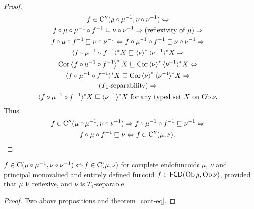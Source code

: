 \begin{proof}
\begin{multline*}
  f \in \continuous'' (\mu \circ \mu^{- 1} , \nu \circ \nu^{- 1})
  \Leftrightarrow \\ f \circ \mu \circ \mu^{- 1} \circ f^{- 1}
  \sqsubseteq \nu \circ \nu^{- 1} \Rightarrow \text{(reflexivity of
  $\mu$)} \Rightarrow \\ f \circ \mu \circ f^{- 1} \sqsubseteq \nu
  \circ \nu^{- 1} \Leftrightarrow f \circ \mu^{- 1} \circ f^{- 1}
  \sqsubseteq \nu \circ \nu^{- 1} \Rightarrow \\ \langle f \circ \mu^{- 1}
  \circ f^{- 1} \rangle^{\ast} X \sqsubseteq \supfun{\nu}^{\ast}
  \langle \nu^{- 1} \rangle^{\ast} X \Rightarrow \\ \Cor \left\langle f
  \circ \mu^{- 1} \circ f^{- 1} \right\rangle^{\ast} X \sqsubseteq
  \Cor \supfun{\nu}^{\ast} \langle \nu^{- 1} \rangle^{\ast} X
  \Leftrightarrow \\ \langle f \circ \mu^{- 1} \circ f^{- 1} \rangle^{\ast}
  X \sqsubseteq \Cor \supfun{\nu}^{\ast} \langle \nu^{- 1}
  \rangle^{\ast} X \Rightarrow \\ \text{($T_1$-separability)} \Rightarrow \\ \langle
  f \circ \mu^{- 1} \circ f^{- 1} \rangle^{\ast} X \sqsubseteq \langle
  \nu^{- 1} \rangle^{\ast} X$ for any typed set $X$ on $\Ob \nu.
\end{multline*}
  Thus
  \begin{multline*}
f \in \mathrm{C}'' (\mu \circ \mu^{- 1} , \nu \circ \nu^{- 1})
  \Rightarrow f \circ \mu^{- 1} \circ f^{- 1} \sqsubseteq \nu^{- 1}
  \Leftrightarrow \\ f \circ \mu \circ f^{- 1} \sqsubseteq \nu
  \Leftrightarrow f \in \mathrm{C}'' (\mu, \nu).
  \end{multline*}
\end{proof}

\begin{thm}
  $f \in \mathrm{C} (\mu \circ \mu^{- 1} , \nu \circ \nu^{- 1})
  \Leftrightarrow f \in \mathrm{C} (\mu, \nu)$ for complete endofuncoids
  $\mu$, $\nu$ and principal monovalued and entirely defined funcoid $f
  \in \mathsf{FCD} (\operatorname{Ob} \mu, \operatorname{Ob} \nu)$, provided that
  $\mu$ is reflexive, and $\nu$ is $T_1$-separable.
\end{thm}

\begin{proof}
  Two above propositions and theorem~\ref{cont-eq}.
\end{proof}

